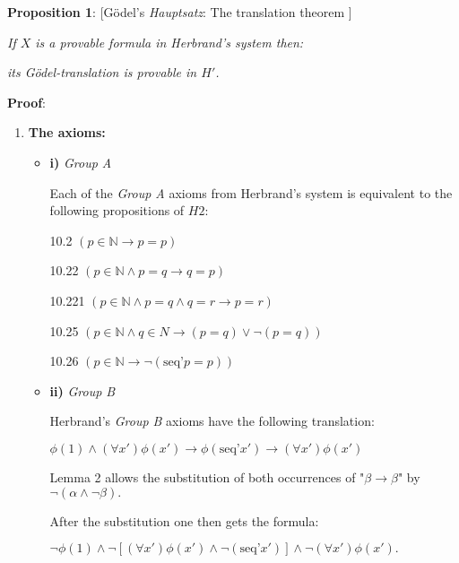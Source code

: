 \documentclass[12pt]{article}
\begin{document}
\medskip
\textbf{Proposition 1}: [G\"{o}del's \emph{Hauptsatz}: The translation theorem ]

\begin{center}
\emph{If $X$ is a provable formula in Herbrand's system then:}
 
\emph{its G\"{o}del-translation is provable in $H'$.}
\end{center}

\medskip
\textbf{Proof}:

\begin{enumerate}

\item \textbf{The axioms:}

\begin{itemize}

\item \textbf{i)} \emph{Group A}
 
Each of the \emph{Group A} axioms from Herbrand's system is equivalent to the following propositions of $H2$:

10.2 $(p \in \mathbb{N} \rightarrow p = p)$

10.22 $(p \in \mathbb{N} \wedge p = q \rightarrow q = p)$

10.221 $(p \in \mathbb{N} \wedge p = q \wedge q = r \rightarrow p = r)$
 
10.25 $(p \in \mathbb{N} \wedge q \in N \rightarrow (p = q) \vee \neg (p = q))$

10.26 $(p \in \mathbb{N} \rightarrow \neg (\text{seq'} p = p))$

\item \textbf{ii)} \emph{Group B}

Herbrand's \emph{Group B} axioms have the following translation:

\begin{center}
$\phi (1) \wedge (\forall x') \phi (x') \rightarrow \phi (\text{seq'} x') \rightarrow (\forall x') \phi (x')$ 
\end{center}

Lemma 2 allows the substitution of both occurrences of "$\beta \rightarrow \beta$" by $\neg (\alpha \wedge \neg \beta).$

After the substitution one then gets the formula:

\begin{center}
$\neg {\phi (1) \wedge \neg [(\forall x') \phi (x') \wedge \neg (\text{seq'} x')] \wedge \neg (\forall x') \phi (x')}.$
\end{center}


\end{itemize}
\end{enumerate}
\end{document}
